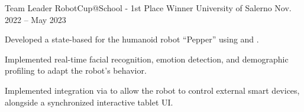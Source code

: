 \begin{cventries}
  \cventry
    {Team Leader} %
    {RobotCup@School - 1st Place Winner} %
    {University of Salerno} %
    {Nov. 2022 -- May 2023} %
    {
      \begin{cvitems} %
        \item {Developed a state-based  for the humanoid robot ``Pepper'' using  and .}
        \item {Implemented real-time facial recognition, emotion detection, and demographic profiling to adapt the robot's behavior.}
        \item {Implemented  integration via  to allow the robot to control external smart devices, alongside a synchronized interactive tablet UI.}
      \end{cvitems}
    }

\end{cventries}